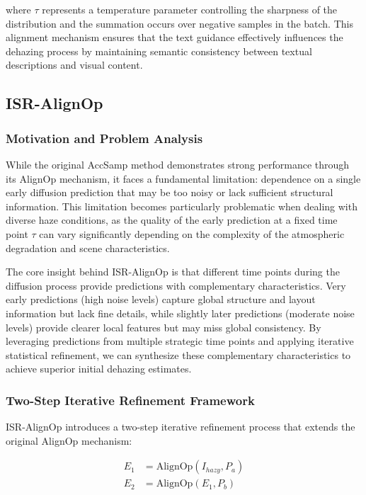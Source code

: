 \documentclass{article}
\begin{document}
where $\tau$ represents a temperature parameter controlling the sharpness of the distribution and the summation occurs over negative samples in the batch. This alignment mechanism ensures that the text guidance effectively influences the dehazing process by maintaining semantic consistency between textual descriptions and visual content.

\subsection{ISR-AlignOp}

\subsubsection{Motivation and Problem Analysis}

While the original AccSamp method demonstrates strong performance through its AlignOp mechanism, it faces a fundamental limitation: dependence on a single early diffusion prediction that may be too noisy or lack sufficient structural information. This limitation becomes particularly problematic when dealing with diverse haze conditions, as the quality of the early prediction at a fixed time point $\tau$ can vary significantly depending on the complexity of the atmospheric degradation and scene characteristics.

The core insight behind ISR-AlignOp is that different time points during the diffusion process provide predictions with complementary characteristics. Very early predictions (high noise levels) capture global structure and layout information but lack fine details, while slightly later predictions (moderate noise levels) provide clearer local features but may miss global consistency. By leveraging predictions from multiple strategic time points and applying iterative statistical refinement, we can synthesize these complementary characteristics to achieve superior initial dehazing estimates.

\subsubsection{Two-Step Iterative Refinement Framework}

ISR-AlignOp introduces a two-step iterative refinement process that extends the original AlignOp mechanism:

\begin{align}
E_1 &= \text{AlignOp}(I_{hazy}, P_a) \label{eq:isr_step1} \\
E_2 &= \text{AlignOp}(E_1, P_b) \label{eq:isr_step2}
\end{align}
\end{document}
